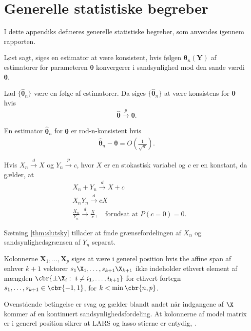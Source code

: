 \chapter{Generelle statistiske begreber}
I dette appendiks defineres generelle statistiske begreber, som anvendes igennem rapporten.

Løst sagt, siges en estimator at være konsistent, hvis følgen $\boldsymbol{\theta}_n(\mathbf{Y})$ af estimatorer for parameteren $\boldsymbol{\theta}$ konvergerer i sandsynlighed mod den sande værdi $\boldsymbol{\theta}$. 
% 
\begin{defn} \label{def:konsistent}
Lad $\{ \boldsymbol{\hat{\theta}}_n \}$ være en følge af estimatorer. Da siges $ \{ \boldsymbol {\hat{\theta}}_n \}$ at være konsistens for $\boldsymbol{\theta}$ hvis
\begin{align*}
\boldsymbol{\hat{\theta}} \overset{p}{\rightarrow} \boldsymbol{\theta}.
\end{align*}
\end{defn}
%
\begin{defn} \label{def:rodn}
En estimator $  \boldsymbol {\hat{\theta}}_n $ for $\boldsymbol{\theta}$ er rod-n-konsistent hvis
\begin{align*}
\boldsymbol {\hat{\theta}}_n  - \boldsymbol{\theta} = O \left( \frac{1}{\sqrt{n}} \right).
\end{align*}
\end{defn}

\begin{thm} \label{thm:slutsky}
Hvis $X_n \overset{d}{\rightarrow} X$ og $Y_n \overset{p}{\rightarrow} c$, hvor $X$ er en stokastisk variabel og $c$ er en konstant, da gælder, at
\begin{align*}
& X_n + Y_n \overset{d}{\rightarrow} X+c \\
& X_n Y_n \overset{d}{\rightarrow} cX \\
& \frac{X_n}{Y_n} \overset{d}{\rightarrow} \frac{X}{c}, \quad \text{forudsat at } P(c=0)=0.
\end{align*}
\end{thm}
Sætning \ref{thm:slutsky} tillader at finde grænsefordelingen af $X_n$ og sandsynlighedsgrænsen af $Y_n$ separat.


\begin{defn} \label{defn:general_position}
Kolonnerne \(\mathbf{X}_1, \ldots, \mathbf{X}_p\) siges at være i generel position hvis the affine span af enhver \(k+1\) vektorer \(s_1 \X_1, \ldots, s_{k+1} \X_{k+1}\) ikke indeholder ethvert element af mængden \(\cbr{\pm \X_i : \ i \neq i_1, \ldots, i_{k+1}}\) for ethvert fortegn \(s_1, \ldots, s_{k+1} \in \cbr{-1,1}\), for \(k < \min \cbr{n,p}\). 
\end{defn}
Ovenstående betingelse er svag og gælder blandt andet når indgangene af \(\X\) kommer af en kontinuert sandsynlighedsfordeling.
At kolonnerne af model matrix er i generel position sikrer at LARS og lasso stierne er entydig, \citep{lasso_unique}.

